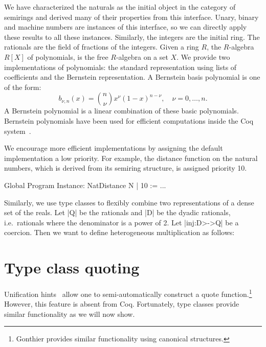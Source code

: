 \documentclass[a4paper,10pt,runningheads]{llncs}
\begin{document}
We have characterized the naturals as the initial object in the category of semirings and derived
many of their properties from this interface. Unary, binary and machine numbers are
instances of this interface, so we can directly apply these results to all these instances.
Similarly, the integers are the initial ring. The rationals are the field of fractions of the
integers. 
Given a ring $R$, the $R$-algebra $R[X]$ of polynomials, is the free $R$-algebra on a set $X$.
We provide two implementations of polynomials: the
standard representation using lists of coefficients and the Bernstein representation. A Bernstein
basis polynomial is one of the form:
\[b_{\nu,n}(x) = {n \choose \nu} x^{\nu} \left( 1 - x \right)^{n - \nu}, \quad \nu = 0, \ldots, n.\]
A Bernstein polynomial is a linear combination of these basic polynomials. Bernstein polynomials
have been used for efficient computations inside the Coq system~\cite{ZumkellerPhD}.

We encourage more efficient implementations by assigning the default implementation a
low priority. For example, the distance function on the natural numbers, which is derived from its
semiring structure, is assigned priority 10.
\begin{code}
  Global Program Instance: NatDistance N | 10 := ...
\end{code}

Similarly, we use type classes to flexibly combine two representations of a dense set of the
reals.
Let |Q| be the rationals and |D| be the dyadic rationals, i.e.\ rationals where the denominator is
a power of 2. Let |inj:D>->Q| be a coercion. Then we want to define heterogeneous multiplication
as follows:



\section{Type class quoting}\label{quote}
Unification hints~\cite{Hints} allow one to semi-automatically construct a quote
function.\footnote{Gonthier provides similar functionality using canonical structures.} However,
this feature is absent from Coq. Fortunately, type classes provide similar functionality as
we will now show.
\end{document}

